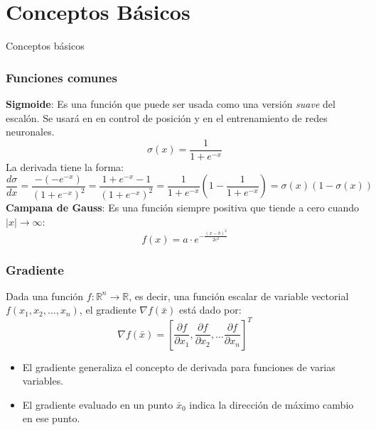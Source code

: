 \section{Conceptos Básicos}

\begin{frame}
  \Huge
  Conceptos básicos
\end{frame}

\begin{frame}\frametitle{Funciones comunes}
  \textbf{Sigmoide}: Es una función que puede ser usada como una versión \textit{suave} del escalón. Se usará en en control de posición y en el entrenamiento de redes neuronales.
  \[\sigma(x) = \frac{1}{1 + e^{-x}}\]
  La derivada tiene la forma:
  \[\frac{d\sigma}{dx}=\frac{-(-e^{-x})}{\left(1 + e^{-x}\right)^2} = \frac{1 + e^{-x} - 1}{\left(1 + e^{-x}\right)^2}=\frac{1}{1+e^{-x}}\left(1 - \frac{1}{1 + e^{-x}}\right) = \sigma(x)(1 - \sigma(x))\]
  \textbf{Campana de Gauss}: Es una función siempre positiva que tiende a cero cuando $|x|\rightarrow \infty$:
  \[f(x) = a \cdot e^{-\frac{(x - b)^2}{2c^2}}\]
\end{frame}

\begin{frame}\frametitle{Gradiente}
  Dada una función $f:\mathbb{R}^n \rightarrow \mathbb{R}$, es decir, una función escalar de variable vectorial $f(x_1, x_2, \dots, x_n)$, el gradiente $\nabla f(\bar{x})$ está dado por:
  \[\nabla f(\bar{x}) = \left[ \frac{\partial f}{\partial x_1}, \frac{\partial f}{\partial x_2}, \dots \frac{\partial f}{\partial x_n}\right]^T\]

  \begin{itemize}
  \item El gradiente generaliza el concepto de derivada para funciones de varias variables.
  \item El gradiente evaluado en un punto $\bar{x}_0$ indica la dirección de máximo cambio en ese punto.
  \end{itemize}
\end{frame}

